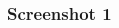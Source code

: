 \documentclass{beamer}
\begin{document}
\begin{frame}
  \frametitle{Screenshot 1}
  \begin{columns}
    \begin{column}{0.25\textwidth}
      \begin{figure}
      \raggedleft
      \setlength{\fboxsep}{0pt}
      \setlength{\fboxrule}{0.1pt}

\end{figure}
\end{column}
\end{columns}
\end{frame}
\end{document}
